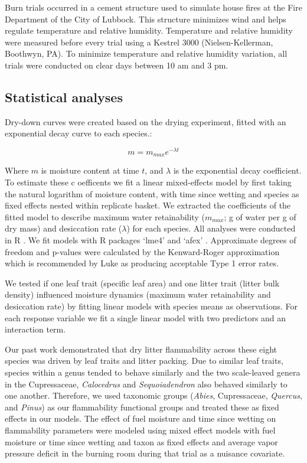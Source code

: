 \documentclass[fire,article,submit,moreauthors,pdftex]{Definitions/mdpi}
\begin{document}
Burn trials occurred in a cement structure used to simulate house fires at the
Fire Department of the City of Lubbock. This structure minimizes wind and helps
regulate temperature and relative humidity. Temperature and relative humidity
were measured before every trial using a Kestrel 3000 (Nielsen-Kellerman,
Boothwyn, PA). To minimize temperature and relative humidity variation, all
trials were conducted on clear days between 10 am and 3 pm.


\subsection{Statistical analyses}

Dry-down curves were created based on the drying experiment, fitted with an exponential decay curve to each species.:

\begin{equation}
m = m_{max} e^{-\lambda t}
\end{equation}

Where $m$ is moisture content at time $t$, and $\lambda$ is the exponential
decay coefficient. To estimate these c oefficents we fit a linear mixed-effects
model by first taking the natural logarithm of moisture content, with time
since wetting and species as fixed effects nested within replicate basket. We
extracted the coefficients of the fitted model to describe maximum water
retainability ($m_{max}$; g of water per g of dry mass) and desiccation rate
($\lambda$) for each species. All analyses were conducted in R
\cite{RCoreTeam-2019}. We fit models with R packages `lme4'
\cite{Bates_Machler_etal-2015} and `afex' \cite{Singmann_Bolker_etal-2017}.
Approximate degrees of freedom and p-values were calculated by the
Kenward-Roger approximation \cite{Kenward_Roger-1997} which is recommended by
Luke \cite{Luke-2017} as producing acceptable Type 1 error rates.

We tested if one leaf trait (specific leaf area) and one litter trait (litter
bulk density) influenced moisture dynamics (maximum water retainability and
desiccation rate) by fitting linear models with species means as observations.
For each response variable we fit a single linear model with two predictors and
an interaction term.

Our past work \cite{Magalhaes+Schwilk-2012} demonstrated that dry litter
flammability across these eight species was driven by leaf traits and litter
packing. Due to similar leaf traits, species within a genus tended to behave
similarly and the two scale-leaved genera in the Cupressaceae,
\emph{Calocedrus} and \emph{Sequoiadendron} also behaved similarly to one
another. Therefore, we used taxonomic groups (\emph{Abies}, Cupressaceae,
\emph{Quercus}, and \emph{Pinus}) as our flammability functional groups and
treated these as fixed effects in our models. The effect of fuel moisture and
time since wetting on flammability parameters were modeled using mixed effect
models with fuel moisture or time since wetting and taxon as fixed effects and
average vapor pressure deficit in the burning room during that trial as a
nuisance covariate.
\end{document}
